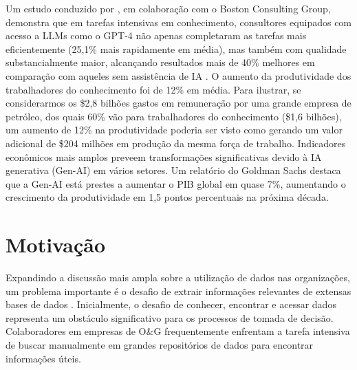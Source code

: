 Um estudo conduzido por \cite{Dellacqua2023}, em colaboração com o Boston Consulting Group, demonstra que em tarefas intensivas em conhecimento, consultores equipados com acesso a LLMs como o GPT-4 não apenas completaram as tarefas mais eficientemente (25,1\% mais rapidamente em média), mas também com qualidade substancialmente maior, alcançando resultados mais de 40\% melhores em comparação com aqueles sem assistência de IA \cite{Dellacqua2023}. O aumento da produtividade dos trabalhadores do conhecimento foi de 12\% em média.
Para ilustrar, se considerarmos os \$2,8 bilhões gastos em remuneração por uma grande empresa de petróleo, dos quais 60\% vão para trabalhadores do conhecimento (\$1,6 bilhões), um aumento de 12\% na produtividade poderia ser visto como gerando um valor adicional de \$204 milhões em produção da mesma força de trabalho.
Indicadores econômicos mais amplos preveem transformações significativas devido à IA generativa (Gen-AI) em vários setores.
Um relatório do Goldman Sachs \cite{Hatzius2023} destaca que a Gen-AI está prestes a aumentar o PIB global em quase 7\%, aumentando o crescimento da produtividade em 1,5 pontos percentuais na próxima década.

\section{Motivação}
Expandindo a discussão mais ampla sobre a utilização de dados nas organizações, um problema importante é o desafio de extrair informações relevantes de extensas bases de dados \cite{Singh2023}.
Inicialmente, o desafio de conhecer, encontrar e acessar dados representa um obstáculo significativo para os processos de tomada de decisão. Colaboradores em empresas de O\&G frequentemente enfrentam a tarefa intensiva de buscar manualmente em grandes repositórios de dados para encontrar informações úteis.

